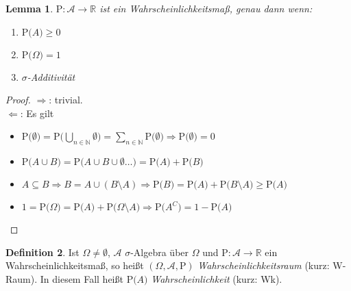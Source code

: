 \documentclass[a4paper,12pt,fleqn]{scrartcl}
\newcommand{\N}{\mathbb{N}}
\newcommand{\R}{\mathbb{R}}
\newcommand{\m}[1]{\mathcal{ #1 }}
\newcommand{\p}[1]{\text{P(} #1 \text{)}}
\newcommand{\WM}{Wahrscheinlichkeitsmaß}
\newcommand{\impl}{\Rightarrow}
\theoremstyle{definition}
\newtheorem{definition}{Definition}[section]
\theoremstyle{plain}
\newtheorem{lemma}[definition]{Lemma}
\theoremstyle{remark}
\begin{document}
\begin{lemma}
$\text{P}:\m{A}\to\R$ ist ein \WM, genau dann wenn:
\begin{enumerate}
\item $\p{A}\geq 0$
\item $\p{\Omega}=1$
\item $\sigma$-Additivität
\end{enumerate}
\end{lemma}
\begin{proof}
\grqq $\impl$\grqq: trivial. \\
\grqq $\Leftarrow$\grqq: Es gilt
\begin{itemize}
\item $\p{\emptyset}=\p{\bigcup_{n\in\N}\emptyset}=\sum_{n\in\N}\p{\emptyset}\impl\p{\emptyset}=0$
\item $\p{ A\cup B}=\p{ A\cup B\cup\emptyset\ldots}=\p{ A}+\p{ B}$
\item $A\subseteq B\impl B=A\cup (B\setminus A)\impl\p{ B}=\p{A}+\p{B\setminus A}\geq\p{A}$
\item $1=\p{\Omega}=\p{A}+\p{\Omega\setminus A}\impl\p{A^C}=1-\p{A}$
\end{itemize}
\end{proof}
\begin{definition}
Ist $\Omega\neq\emptyset$, $\m{A}$ $\sigma$-Algebra über $\Omega$ und $\text{P}:\m{A}\to\R$ ein \WM, so heißt $(\Omega,\m{A},\text{P})$ \emph{Wahrscheinlichkeitsraum} (kurz: W-Raum). In diesem Fall heißt $\p{A}$ \emph{Wahrscheinlichkeit} (kurz: Wk).
\end{definition}
\end{document}
